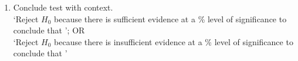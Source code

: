 \documentclass[../main]{subfiles}
\begin{document}
\begin{enumerate}
		\item Conclude test with context. \\

			`Reject \(H_0\) because there is sufficient evidence at a \underline{\hspace{0.5cm}}\% level of significance to conclude that \underline{\hspace{0.7cm}} '; OR \\

			`Reject \(H_0\) because there is insufficient evidence at a \underline{\hspace{0.5cm}}\% level of significance to conclude that \underline{\hspace{0.7cm}} ' \\

	\end{enumerate}
\end{document}
